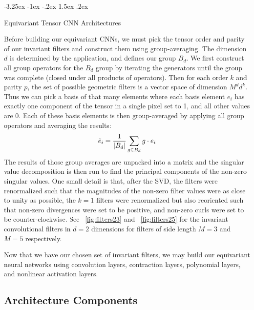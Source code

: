 \documentclass{article}
\makeatletter
\theoremstyle{definition}
\renewcommand\section{\@startsection {section}{1}{\z@}%
  {-3.25ex \@plus -1ex \@minus -.2ex}%
  {1.5ex \@plus .2ex}%
  {\raggedright\normalfont\large\bfseries}}%
\makeatother
\begin{document}
\section{Equivariant Tensor CNN Architectures}\label{sec:architectures}

Before building our equivariant CNNs, we must pick the tensor order and parity of our invariant filters and construct them using group-averaging. The dimension $d$ is determined by the application, and defines our group $B_d$. We first construct all group operators for the $B_d$ group by iterating the generators until the group was complete (closed under all products of operators). Then for each order $k$ and parity $p$, the set of possible geometric filters is a vector space of dimension $M^d d^k$. Thus we can pick a basis of that many elements where each basis element $e_i$ has exactly one component of the tensor in a single pixel set to 1, and all other values are 0. Each of these basis elements is then group-averaged by applying all group operators and averaging the results:
\begin{equation}
   \tilde{e}_i = \frac{1}{\qty|B_d|}\sum_{g \in B_d} g \cdot e_i
\end{equation}
The results of those group averages are unpacked into a matrix and the singular value decomposition is then run to find the principal components of the non-zero singular values.
One small detail is that, after the SVD, the filters were renormalized such that the magnitudes of the non-zero filter values were as close to unity as possible, the $k=1$ filters were renormalized but also reoriented such that non-zero divergences were set to be positive, and non-zero curls were set to be counter-clockwise. See \figurename~\ref{fig:filters23} and \figurename~\ref{fig:filters25} for the invariant convolutional filters
in $d=2$ dimensions for filters of side length $M=3$ and $M=5$ respectively. 

Now that we have our chosen set of invariant filters, we may build our equivariant neural networks using convolution layers, contraction layers, polynomial layers, and nonlinear activation layers.

\subsection{Architecture Components}
\end{document}
